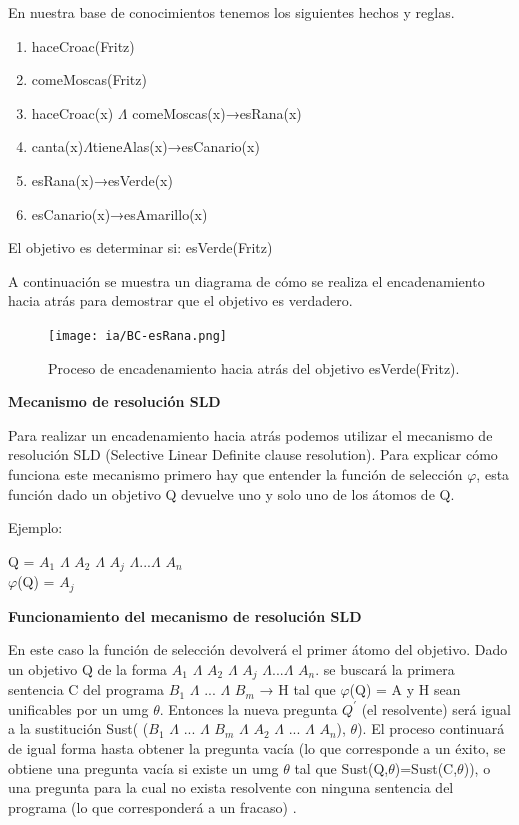 \documentclass[11pt,fleqn]{book} %
\begin{document}
En nuestra base de conocimientos tenemos los siguientes hechos y reglas.

\begin{enumerate}
\item haceCroac(Fritz)
\item comeMoscas(Fritz)
\item haceCroac(x) $\Lambda$ comeMoscas(x)→esRana(x)
\item canta(x)$\Lambda$tieneAlas(x)→esCanario(x)
\item esRana(x)→esVerde(x)
\item esCanario(x)→esAmarillo(x)
\end{enumerate}

El objetivo es determinar si: esVerde(Fritz)

A continuación se muestra un diagrama de cómo se realiza el encadenamiento hacia atrás para demostrar que el objetivo es verdadero.

\begin{figure}[ht]
\centering\texttt{[image: ia/BC-esRana.png]}
\caption{Proceso de encadenamiento hacia atrás del objetivo esVerde(Fritz).}

\label{fig:BC-esRana} 
\end{figure}

\textbf{Mecanismo de resolución SLD}

Para realizar un encadenamiento hacia atrás podemos utilizar el mecanismo de resolución SLD (Selective Linear Definite clause resolution). Para explicar cómo funciona este mecanismo primero hay que entender la función de selección $\varphi $, esta función dado un objetivo Q devuelve uno y solo uno de los átomos de Q.

\clearpage
Ejemplo:
 
Q = $A_1$ $\Lambda$ $A_2$ $\Lambda$ $A_j$ $\Lambda$...$\Lambda$ $A_n$\\
$\varphi $(Q) = $A_j$

\textbf{Funcionamiento del mecanismo de resolución SLD}

En este caso la función de selección devolverá el primer átomo del objetivo.
Dado un objetivo Q de la forma $A_1$ $\Lambda$ $A_2$ $\Lambda$ $A_j$ $\Lambda$...$\Lambda$ $A_n$. se buscará la primera sentencia C del programa $B_1$ $\Lambda$ ... $\Lambda$ $B_m$ → H tal que $\varphi $(Q) = A y H sean unificables por un umg $\theta$. Entonces la nueva pregunta $Q^{'}$ (el resolvente) será igual a la sustitución Sust( ($B_1$ $\Lambda$ ... $\Lambda$ $B_m$ $\Lambda$ $A_2$ $\Lambda$ ... $\Lambda$ $A_n$), $\theta$). El proceso continuará de igual forma hasta obtener la pregunta vacía (lo que corresponde a un éxito, se obtiene una pregunta vacía si existe un umg $\theta$ tal que Sust(Q,$\theta$)=Sust(C,$\theta$)), o una pregunta para la cual no exista resolvente con ninguna sentencia del programa (lo que corresponderá a un fracaso) \cite{navarro_prolog}.
\end{document}
